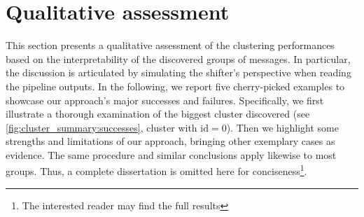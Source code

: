 \section{Qualitative assessment}
\label{sec:opint:qualitative}
This section presents a qualitative assessment of the clustering performances based on the interpretability of the discovered groups of messages.
In particular, the discussion is articulated by simulating the shifter's perspective when reading the pipeline outputs.
In the following, we report five cherry-picked examples to showcase our approach's major successes and failures.
Specifically, we first illustrate a thorough examination of the biggest cluster discovered (see \cref{fig:cluster_summary:successes}, cluster with $\text{id}=0$).
Then we highlight some strengths and limitations of our approach, bringing other exemplary cases as evidence.
The same procedure and similar conclusions apply likewise to most groups. Thus, a complete dissertation is omitted here for conciseness\footnote{The interested reader may find the full results \opintresults}.



